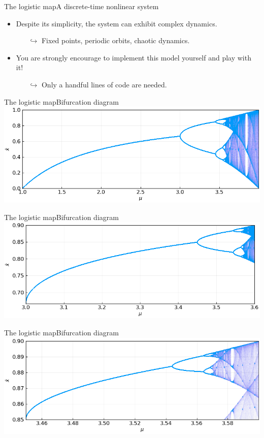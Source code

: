 \documentclass[usenames,dvipsnames,svgnames,10pt,aspectratio=169]{beamer}
\begin{document}
\begin{frame}[t, c]{The logistic map}{A discrete-time nonlinear system}
\begin{minipage}{.68\textwidth}
\begin{itemize}
			\item Despite its simplicity, the system can exhibit complex dynamics.
			\begin{itemize}
				\item[\( \hookrightarrow \)] Fixed points, periodic orbits, chaotic dynamics.
			\end{itemize}

			\medskip

			\item You are strongly encourage to implement this model yourself and play with it!
			\begin{itemize}
				\item [\( \hookrightarrow \)] Only a handful lines of code are needed.
			\end{itemize}

		\end{itemize}
	\end{minipage}

	\vspace{1cm}
\end{frame}

\begin{frame}[t, c]{The logistic map}{Bifurcation diagram}
	\centering
	\includegraphics[width=.8\textwidth]{logistic_map_bifucartion_diagram_1}
\end{frame}

\begin{frame}[t, c]{The logistic map}{Bifurcation diagram}
	\centering
	\includegraphics[width=.8\textwidth]{logistic_map_bifucartion_diagram_2}
\end{frame}

\begin{frame}[t, c]{The logistic map}{Bifurcation diagram}
	\centering
	\includegraphics[width=.8\textwidth]{logistic_map_bifucartion_diagram_3}
\end{frame}
\end{document}
